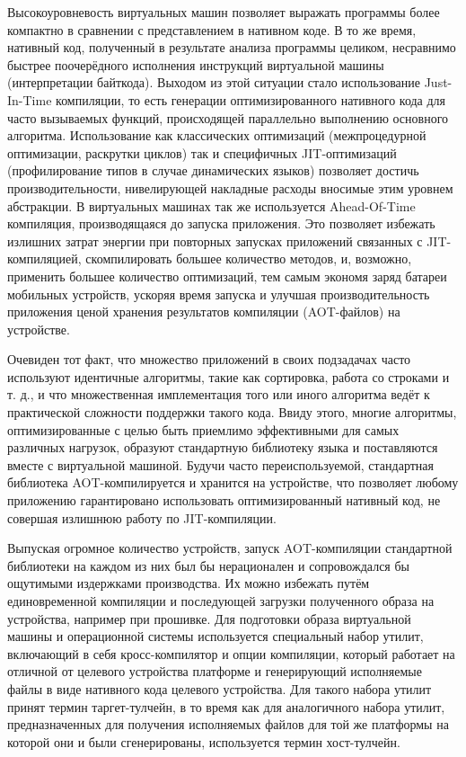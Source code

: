 \par
Высокоуровневость виртуальных машин позволяет выражать программы более компактно в сравнении с представлением в нативном коде.
В то же время, нативный код, полученный в результате анализа программы целиком, несравнимо быстрее поочерёдного исполнения инструкций виртуальной машины (интерпретации байткода).
Выходом из этой ситуации стало использование Just-In-Time компиляции, то есть генерации оптимизированного нативного кода для часто вызываемых функций, происходящей параллельно выполнению основного алгоритма.
Использование как классических оптимизаций (межпроцедурной оптимизации, раскрутки циклов) так и специфичных JIT-оптимизаций (профилирование типов в случае динамических языков) позволяет достичь производительности, нивелирующей накладные расходы вносимые этим уровнем абстракции.
В виртуальных машинах так же используется Ahead-Of-Time компиляция, производящаяся до запуска приложения.
Это позволяет избежать излишних затрат энергии при повторных запусках приложений связанных с JIT-компиляцией, скомпилировать большее количество методов, и, возможно, применить большее количество оптимизаций, тем самым экономя заряд батареи мобильных устройств, ускоряя время запуска и улучшая производительность приложения ценой хранения результатов компиляции (AOT-файлов) на устройстве.

\par
Очевиден тот факт, что множество приложений в своих подзадачах часто используют идентичные алгоритмы, такие как сортировка, работа со строками и т. д., и что множественная имплементация того или иного алгоритма ведёт к практической сложности поддержки такого кода.
Ввиду этого, многие алгоритмы, оптимизированные с целью быть приемлимо эффективными для самых различных нагрузок, образуют стандартную библиотеку языка и поставляются вместе с виртуальной машиной.
Будучи часто переиспользуемой, стандартная библиотека AOT-компилируется и хранится на устройстве, что позволяет любому приложению гарантировано использовать оптимизированный нативный код, не совершая излишнюю работу по JIT-компиляции.

\par
Выпуская огромное количество устройств, запуск AOT-компиляции стандартной библиотеки на каждом из них был бы нерационален и сопровождался бы ощутимыми издержками производства.
Их можно избежать путём единовременной компиляции и последующей загрузки полученного образа на устройства, например при прошивке.
Для подготовки образа виртуальной машины и операционной системы используется специальный набор утилит, включающий в себя кросс-компилятор и опции компиляции, который работает на отличной от целевого устройства платформе и генерирующий исполняемые файлы в виде нативного кода целевого устройства.
Для такого набора утилит принят термин таргет-тулчейн, в то время как для аналогичного набора утилит, предназначенных для получения исполняемых файлов для той же платформы на которой они и были сгенерированы, используется термин хост-тулчейн.


